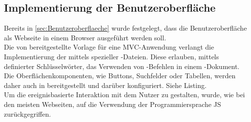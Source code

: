 \subsection{Implementierung der Benutzeroberfläche}
\label{sec:ImplementierungBenutzeroberflaeche}
Bereits in \ref{sec:Benutzeroberflaeche}  wurde festgelegt, dass die Benutzeroberfläche
als Webseite in einem Browser ausgeführt werden soll.\\
Die von  bereitgestellte Vorlage für eine \ac{MVC}-Anwendung verlangt
die Implementierung der  mittels spezieller -Dateien.
Diese erlauben, mittels definierter Schlüsselwörter, das Verwenden von -Befehlen in einem
-Dokument. Die Oberflächenkomponenten, wie \zB Buttons, Suchfelder oder Tabellen, werden
daher auch in  bereitgestellt und darüber konfiguriert. Siehe Listing.\\
Um die ereignisbasierte Interaktion mit dem Nutzer zu gestalten, wurde, wie bei den meisten Webseiten,
auf die Verwendung der Programmiersprache \acs{JS} zurückgegriffen.

